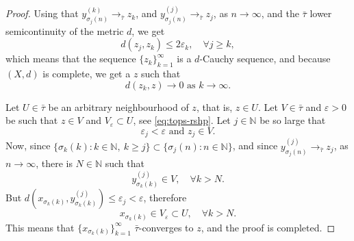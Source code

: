 \documentclass[12pt,leqno]{article}
\theoremstyle{definition}
\theoremstyle{remark}
\begin{document}
\begin{proof}
    Using that
    $
         y_{\sigma_j(n)}^{(k)} \to_{\bar\tau} z_k$, and $  y_{\sigma_j(n)}^{(j)} \to_{\bar\tau} z_j$, as $n\to \infty$,
        and the $\bar\tau$ lower semicontinuity of the metric $d$, we get
    $$
        d(z_j,z_k) \le 2 \varepsilon_k,\quad\forall j \ge k,
    $$
    which means that the sequence $\{z_k\}_{k=1}^\infty$ is a $d$-Cauchy sequence, and because $(X,d)$ is complete, we get a $z$ such that
    $$
         d(z_k,z) \to 0\text{ as } k\to \infty.
    $$

    Let $U\in\bar\tau$ be an arbitrary neighbourhood of $z$, that is, $z\in U$. Let $V\in\bar\tau$ and $\varepsilon>0$ be such that $z\in V$ and $V_\varepsilon\subset U$, see \eqref{eq:tops-rshp}. Let $j\in\mathbb{N}$ be so large that
    $$
        \varepsilon_j < \varepsilon\text{ and }z_j\in V.
    $$
    Now, since $
        \{\sigma_k(k):k\in\mathbb{N},\ k\ge j\} \subset \{\sigma_j(n): n\in\mathbb{N}\}$,
    and since $y_{\sigma_j(n)}^{(j)} \to_{\bar\tau} z_j$, as $n\to \infty$, there is $N\in\mathbb{N}$ such that
    $$
        y^{(j)}_{\sigma_k(k)} \in V,\quad \forall k > N.
    $$
    But $d(x_{\sigma_k(k)},y^{(j)}_{\sigma_k(k)}) \le \varepsilon_j < \varepsilon$, therefore
    $$
        x_{\sigma_k(k)} \in V_\varepsilon \subset U,\quad \forall k > N.
    $$
    This means that $\{x_{\sigma_k(k)}\}_{k=1}^\infty$ $\bar\tau$-converges to $z$, and the proof is  completed.
\end{proof}
\end{document}

